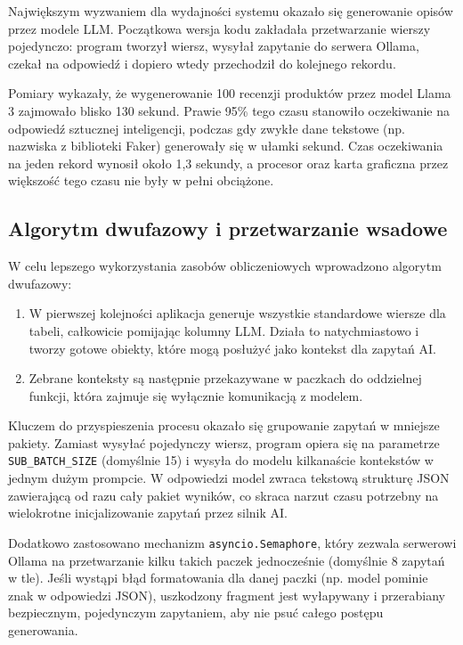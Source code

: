 Największym wyzwaniem dla wydajności systemu okazało się generowanie opisów przez modele \gls{LLM}. Początkowa wersja kodu zakładała przetwarzanie wierszy pojedynczo: program tworzył wiersz, wysyłał zapytanie do serwera Ollama, czekał na odpowiedź i dopiero wtedy przechodził do kolejnego rekordu.

Pomiary wykazały, że wygenerowanie 100 recenzji produktów przez model Llama 3 zajmowało blisko 130 sekund. Prawie 95\% tego czasu stanowiło oczekiwanie na odpowiedź sztucznej inteligencji, podczas gdy zwykłe dane tekstowe (np. nazwiska z biblioteki Faker) generowały się w ułamki sekund. Czas oczekiwania na jeden rekord wynosił około 1,3 sekundy, a procesor oraz karta graficzna przez większość tego czasu nie były w pełni obciążone.

\subsection*{Algorytm dwufazowy i przetwarzanie wsadowe}
W celu lepszego wykorzystania zasobów obliczeniowych wprowadzono algorytm dwufazowy:
\begin{enumerate}
    \item W pierwszej kolejności aplikacja generuje wszystkie standardowe wiersze dla tabeli, całkowicie pomijając kolumny LLM. Działa to natychmiastowo i tworzy gotowe obiekty, które mogą posłużyć jako kontekst dla zapytań AI.
    \item Zebrane konteksty są następnie przekazywane w paczkach do oddzielnej funkcji, która zajmuje się wyłącznie komunikacją z modelem.
\end{enumerate}

Kluczem do przyspieszenia procesu okazało się grupowanie zapytań w mniejsze pakiety. Zamiast wysyłać pojedynczy wiersz, program opiera się na parametrze \texttt{SUB\_BATCH\_SIZE} (domyślnie 15) i wysyła do modelu kilkanaście kontekstów w jednym dużym prompcie. W odpowiedzi model zwraca tekstową strukturę \gls{JSON} zawierającą od razu cały pakiet wyników, co skraca narzut czasu potrzebny na wielokrotne inicjalizowanie zapytań przez silnik AI.

Dodatkowo zastosowano mechanizm \texttt{asyncio.Semaphore}, który zezwala serwerowi Ollama na przetwarzanie kilku takich paczek jednocześnie (domyślnie 8 zapytań w tle). Jeśli wystąpi błąd formatowania dla danej paczki (np. model pominie znak w odpowiedzi \gls{JSON}), uszkodzony fragment jest wyłapywany i przerabiany bezpiecznym, pojedynczym zapytaniem, aby nie psuć całego postępu generowania.

